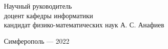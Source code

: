 \vspace*{4\baselineskip}

\begin{adjustwidth}{2em}{0pt}
\noindent
Научный руководитель\\
доцент кафедры информатики\\
кандидат физико-математических наук
\null\hfill А. С. Анафиев
\end{adjustwidth}

\vspace*{1\baselineskip}


\vfill

\begin{center} Симферополь --- 2022 \end{center}
\thispagestyle{empty} %
\restoregeometry